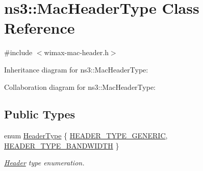 \hypertarget{classns3_1_1MacHeaderType}{}\section{ns3\+:\+:Mac\+Header\+Type Class Reference}
\label{classns3_1_1MacHeaderType}


{\ttfamily \#include $<$wimax-\/mac-\/header.\+h$>$}



Inheritance diagram for ns3\+:\+:Mac\+Header\+Type\+:


Collaboration diagram for ns3\+:\+:Mac\+Header\+Type\+:
\subsection*{Public Types}
\begin{DoxyCompactItemize}
\item 
enum \hyperlink{classns3_1_1MacHeaderType_a54d8fc8bc93a2b7865627965cdd31c20}{Header\+Type} \{ \hyperlink{classns3_1_1MacHeaderType_a54d8fc8bc93a2b7865627965cdd31c20a48fe5b2f20cadf78008c71469b518403}{H\+E\+A\+D\+E\+R\+\_\+\+T\+Y\+P\+E\+\_\+\+G\+E\+N\+E\+R\+IC}, 
\hyperlink{classns3_1_1MacHeaderType_a54d8fc8bc93a2b7865627965cdd31c20a10501251f4c20ab02eb98217c4171e0e}{H\+E\+A\+D\+E\+R\+\_\+\+T\+Y\+P\+E\+\_\+\+B\+A\+N\+D\+W\+I\+D\+TH}
 \}\begin{DoxyCompactList}\small\item\em \hyperlink{classns3_1_1Header}{Header} type enumeration. \end{DoxyCompactList}
\end{DoxyCompactItemize}
